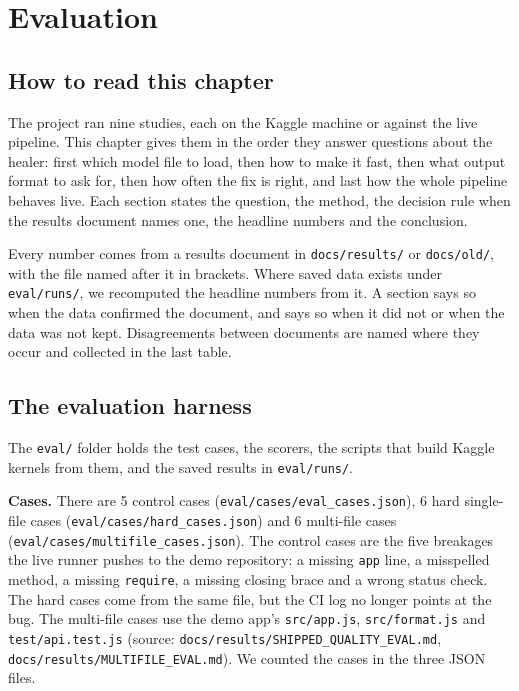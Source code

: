 \documentclass[11pt,a4paper]{report}
\begin{document}
\chapter{Evaluation}

\section{How to read this chapter}

The project ran nine studies, each on the Kaggle machine or against the live pipeline. This chapter gives them in the order they answer questions about the healer: first which model file to load, then how to make it fast, then what output format to ask for, then how often the fix is right, and last how the whole pipeline behaves live. Each section states the question, the method, the decision rule when the results document names one, the headline numbers and the conclusion.

Every number comes from a results document in \texttt{docs/\allowbreak{}results/\allowbreak{}} or \texttt{docs/\allowbreak{}old/\allowbreak{}}, with the file named after it in brackets. Where saved data exists under \texttt{eval/\allowbreak{}runs/\allowbreak{}}, we recomputed the headline numbers from it. A section says so when the data confirmed the document, and says so when it did not or when the data was not kept. Disagreements between documents are named where they occur and collected in the last table.

\section{The evaluation harness}

The \texttt{eval/\allowbreak{}} folder holds the test cases, the scorers, the scripts that build Kaggle kernels from them, and the saved results in \texttt{eval/\allowbreak{}runs/\allowbreak{}}.

\textbf{Cases.} There are 5 control cases (\texttt{eval/\allowbreak{}cases/\allowbreak{}eval\_\allowbreak{}cases.\allowbreak{}json}), 6 hard single-file cases (\texttt{eval/\allowbreak{}cases/\allowbreak{}hard\_\allowbreak{}cases.\allowbreak{}json}) and 6 multi-file cases (\texttt{eval/\allowbreak{}cases/\allowbreak{}multifile\_\allowbreak{}cases.\allowbreak{}json}). The control cases are the five breakages the live runner pushes to the demo repository: a missing \texttt{app} line, a misspelled method, a missing \texttt{require}, a missing closing brace and a wrong status check. The hard cases come from the same file, but the CI log no longer points at the bug. The multi-file cases use the demo app's \texttt{src/\allowbreak{}app.\allowbreak{}js}, \texttt{src/\allowbreak{}format.\allowbreak{}js} and \texttt{test/\allowbreak{}api.\allowbreak{}test.\allowbreak{}js} (source: \texttt{docs/\allowbreak{}results/\allowbreak{}SHIPPED\_\allowbreak{}QUALITY\_\allowbreak{}EVAL.\allowbreak{}md}, \texttt{docs/\allowbreak{}results/\allowbreak{}MULTIFILE\_\allowbreak{}EVAL.\allowbreak{}md}). We counted the cases in the three JSON files.
\end{document}
